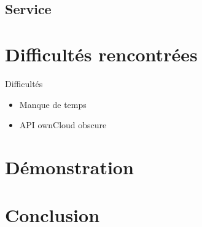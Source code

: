 \documentclass{beamer}
\begin{document}
	\subsection{Service}
		\begin{frame}{}
		\begin{itemize}

		\end{itemize}
		\end{frame}

		\begin{frame}{}
		\begin{itemize}

		\end{itemize}
		\end{frame}


	


\section{Difficultés rencontrées}
\begin{frame}{Difficultés}
		\begin{itemize}
		\item Manque de temps
		\item API ownCloud obscure
		\end{itemize}
		\end{frame}


\section{Démonstration}

\section{Conclusion}
\end{document}
